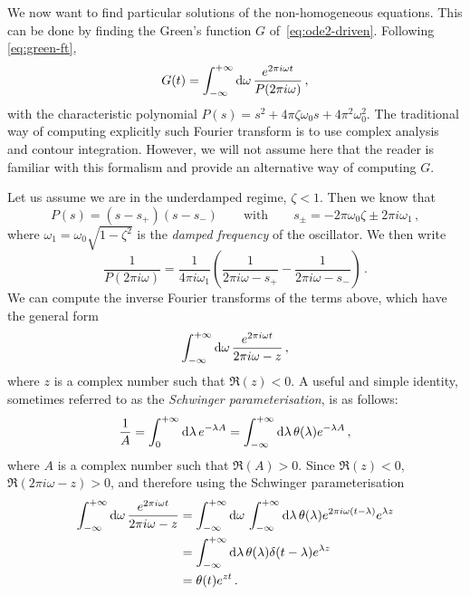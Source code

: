 We now want to find particular solutions of the non-homogeneous equations. This can be
done by finding the Green's function $G$ of~\cref{eq:ode2-driven}. Following
\cref{eq:green-ft},
\begin{equation}
  G(t)=\int_{-\infty}^{+\infty}\mathrm{d}{\omega}\,\frac{e^{2\pi i\omega t}}{P(2\pi i\omega)}\,,
\end{equation}
with the characteristic polynomial $P(s)=s^2+4\pi\zeta\omega_0s+4\pi^2\omega_0^2$. The
traditional way of computing explicitly such Fourier transform is to use complex analysis
and contour integration. However, we will not assume here that the reader is familiar with
this formalism and provide an alternative way of computing $G$.

Let us assume we are in the underdamped regime, \ie $\zeta<1$. Then we know that
\begin{equation}
  P(s)=(s-s_+)(s-s_-)\qquad\text{with}\qquad
  s_\pm=-2\pi\omega_0\zeta\pm 2\pi i\omega_1\,,
\end{equation}
where $\omega_1=\omega_0\sqrt{1-\zeta^2}$ is the \emph{damped frequency} of the
oscillator. We then write
\begin{equation}
  \frac{1}{P(2\pi i\omega)}=\frac{1}{4\pi i\omega_1}\left(\frac{1}{2\pi i\omega-s_+}
  -\frac{1}{2\pi i\omega-s_-}\right)\,.
  \label{eq:p-part-frac}
\end{equation}
We can compute the inverse Fourier transforms of the terms above, which have the general
form
\begin{equation}
  \int_{-\infty}^{+\infty}\mathrm{d}{\omega}\,\frac{e^{2\pi i\omega t}}{2\pi i \omega-z}\,,
\end{equation}
where $z$ is a complex number such that $\Re(z)<0$. A useful and simple identity,
sometimes referred to as the \emph{Schwinger parameterisation}, is as follows:
\begin{equation}
  \frac{1}{A}=\int_0^{+\infty}\mathrm{d}\lambda\,e^{-\lambda A}
  =\int_{-\infty}^{+\infty}\mathrm{d}{\lambda}\,\theta(\lambda)e^{-\lambda A}\,,
\end{equation}
where $A$ is a complex number such that $\Re(A)>0$. Since $\Re(z)<0$, $\Re(2\pi i
\omega-z)>0$, and therefore using the Schwinger parameterisation
\begin{align}
  \int_{-\infty}^{+\infty}\mathrm{d}{\omega}\,\frac{e^{2\pi i\omega t}}{2\pi i \omega-z}&=
  \int_{-\infty}^{+\infty}\mathrm{d}{\omega}\,\int_{-\infty}^{+\infty}\mathrm{d}{\lambda}\,\theta(\lambda)
  e^{2\pi i\omega(t-\lambda)}e^{\lambda z}\notag\\
  &=\int_{-\infty}^{+\infty}\mathrm{d}{\lambda}\,\theta(\lambda)\delta(t-\lambda)e^{\lambda z}\notag\\
  &=\theta(t)e^{zt}\,.
\end{align}
